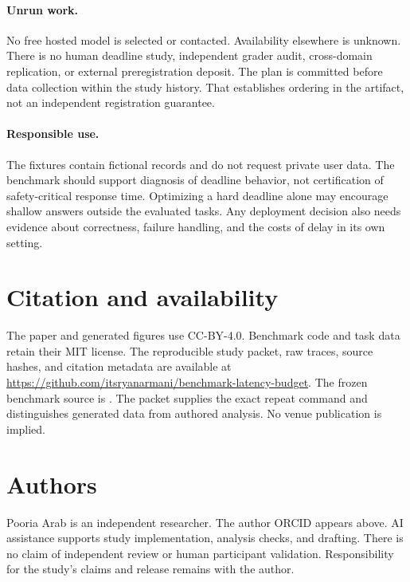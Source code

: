 \documentclass{article}
\begin{document}
\paragraph{Unrun work.} No free hosted model is selected or contacted. Availability elsewhere is unknown. There is no human deadline study, independent grader audit, cross-domain replication, or external preregistration deposit. The plan is committed before data collection within the study history. That establishes ordering in the artifact, not an independent registration guarantee.\par
\paragraph{Responsible use.} The fixtures contain fictional records and do not request private user data. The benchmark should support diagnosis of deadline behavior, not certification of safety-critical response time. Optimizing a hard deadline alone may encourage shallow answers outside the evaluated tasks. Any deployment decision also needs evidence about correctness, failure handling, and the costs of delay in its own setting.\par
\section{Citation and availability}
The paper and generated figures use CC-BY-4.0. Benchmark code and task data retain their MIT license. The reproducible study packet, raw traces, source hashes, and citation metadata are available at \url{https://github.com/itsryanarmani/benchmark-latency-budget}. The frozen benchmark source is \texttt{\SourceCommit}. The packet supplies the exact repeat command and distinguishes generated data from authored analysis. No venue publication is implied.\par
\section{Authors}
Pooria Arab is an independent researcher. The author ORCID appears above. AI assistance supports study implementation, analysis checks, and drafting. There is no claim of independent review or human participant validation. Responsibility for the study's claims and release remains with the author.\par


\end{document}
